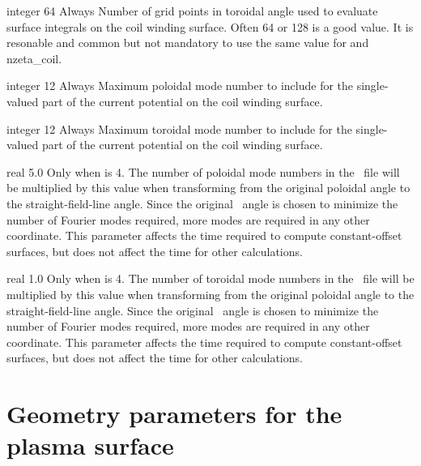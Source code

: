 \myhrule

{integer}
{64}
{Always}
{Number of grid points in toroidal angle used to evaluate surface integrals on the coil winding surface.
Often 64 or 128 is a good value.
It is resonable and common but not mandatory to use the same value for  and {\ttfamily nzeta\_coil}.}

\myhrule

{integer}
{12}
{Always}
{Maximum poloidal mode number to include for the single-valued part of the current potential on the coil winding surface.
}

\myhrule

{integer}
{12}
{Always}
{
Maximum toroidal mode number to include for the single-valued part of the current potential on the coil winding surface.
}

\myhrule

{real}
{5.0}
{Only when  is 4.}
{The number of poloidal mode numbers in the \vmec~file will be multiplied by this value
when transforming from the original poloidal angle to the straight-field-line angle.
Since the original \vmec~angle is chosen to minimize the number of Fourier modes required,
more modes are required in any other coordinate.
This parameter affects the time required to compute constant-offset surfaces,
but does not affect the time for other calculations.
}

\myhrule

{real}
{1.0}
{Only when  is 4.}
{The number of toroidal mode numbers in the \vmec~file will be multiplied by this value
when transforming from the original poloidal angle to the straight-field-line angle.
Since the original \vmec~angle is chosen to minimize the number of Fourier modes required,
more modes are required in any other coordinate.
This parameter affects the time required to compute constant-offset surfaces,
but does not affect the time for other calculations.
}

\section{Geometry parameters for the plasma surface}

